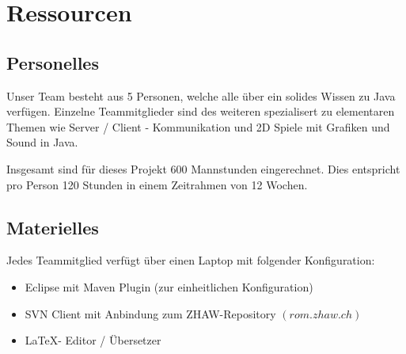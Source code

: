 \section{Ressourcen}
\subsection{Personelles}
Unser Team besteht aus 5 Personen, welche alle über ein solides Wissen zu Java verfügen. Einzelne Teammitglieder sind des weiteren spezialisert zu elementaren Themen wie Server / Client - Kommunikation und 2D Spiele mit Grafiken und Sound in Java.

Insgesamt sind für dieses Projekt 600 Mannstunden eingerechnet. Dies entspricht pro Person 120 Stunden in einem Zeitrahmen von 12 Wochen.

\subsection{Materielles}
Jedes Teammitglied verfügt über einen Laptop mit folgender Konfiguration:

\begin{itemize}
\item Eclipse mit Maven Plugin (zur einheitlichen Konfiguration)
\item SVN Client mit Anbindung zum ZHAW-Repository $(rom.zhaw.ch)$
\item \LaTeX  - Editor / Übersetzer
\end{itemize}